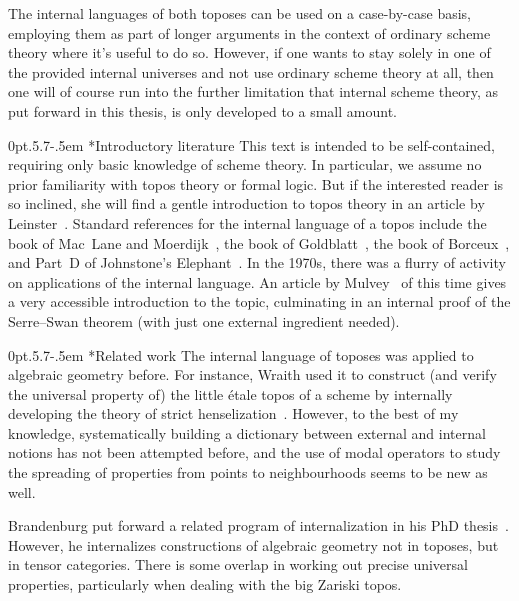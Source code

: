 \documentclass[10pt,reqno,a4paper]{amsbook}
\makeatletter
\theoremstyle{definition}
\theoremstyle{plain}
\theoremstyle{remark}
\newcommand{\?}{\,{:}\,}
\renewcommand{\_}{\mathpunct{.}\,}
\def\subsection{\@startsection{subsection}{2}%
  {0pt}{.5\linespacing\@plus.7\linespacing}{-.5em}%
  {\normalfont\bfseries}}
\makeatother
\begin{document}
{The internal languages of both toposes can be used on a case-by-case
basis, employing them as part of longer arguments in the context of ordinary scheme
theory where it's useful to do so. However, if one wants to stay solely in one
of the provided internal universes and not use ordinary scheme theory at all,
then one will of course run into the further limitation that internal scheme
theory, as put forward in this thesis, is only developed to a small amount.


\subsection*{Introductory literature} This text is intended
to be self-contained, requiring only basic knowledge of scheme theory. In
particular, we assume no prior familiarity with topos theory or formal logic.
But if the interested reader is so inclined, she will find a gentle
introduction to topos theory in an article by
Leinster~\cite{leinster:introduction}. Standard references for the internal
language of a topos include the book of Mac~Lane and
Moerdijk~\cite[Chapter~VI]{moerdijk-maclane:sheaves-logic}, the book of
Goldblatt~\cite[Chapter~14]{goldblatt:topoi}, the book of
Borceux~\cite[Chapter~6]{borceux:handbook3}, and Part~D of
Johnstone's Elephant~\cite{johnstone:elephant}. In the 1970s, there was a
flurry of activity on applications of the internal language. An article by
Mulvey~\cite{mulvey:repr} of this time gives a very accessible
introduction to the topic, culminating in an internal proof of the Serre--Swan
theorem (with just one external ingredient needed).


\subsection*{Related work} The internal language of toposes was applied to algebraic geometry before. For
instance, Wraith used it to construct (and verify the universal property
of) the little étale topos of a scheme by internally developing the theory of
strict henselization~\cite{wraith:generic-galois-theory}. However, to the best
of my knowledge, systematically building a dictionary between external and
internal notions has not been attempted before, and the use of modal operators
to study the spreading of properties from points to neighbourhoods seems to be
new as well.

Brandenburg put forward a related program of internalization in his PhD
thesis~\cite{brandenburg:tensor-foundations}. However, he internalizes
constructions of algebraic geometry not in toposes, but in tensor categories.
There is some overlap in working out precise universal properties, particularly
when dealing with the big Zariski topos.

}
\end{document}
